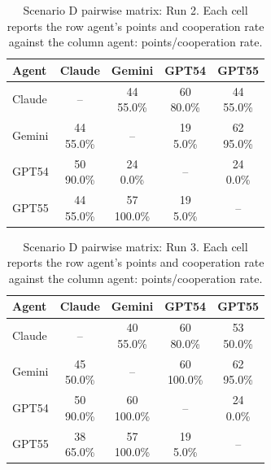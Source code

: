 \documentclass[11pt]{article}
\begin{document}
\begin{table}[H]
\centering
\caption{Scenario D pairwise matrix: Run 2. Each cell reports the row agent's points and cooperation rate against the column agent: points/cooperation rate.}
\label{tab:comm_matrix_run2}
\small
\begin{tabular}{lcccc}
\toprule
Agent & Claude & Gemini & GPT54 & GPT55 \\
\midrule
Claude & -- & \shortstack{44\\55.0\%} & \shortstack{60\\80.0\%} & \shortstack{44\\55.0\%} \\
Gemini & \shortstack{44\\55.0\%} & -- & \shortstack{19\\5.0\%} & \shortstack{62\\95.0\%} \\
GPT54 & \shortstack{50\\90.0\%} & \shortstack{24\\0.0\%} & -- & \shortstack{24\\0.0\%} \\
GPT55 & \shortstack{44\\55.0\%} & \shortstack{57\\100.0\%} & \shortstack{19\\5.0\%} & -- \\
\bottomrule
\end{tabular}
\end{table}

\begin{table}[H]
\centering
\caption{Scenario D pairwise matrix: Run 3. Each cell reports the row agent's points and cooperation rate against the column agent: points/cooperation rate.}
\label{tab:comm_matrix_run3}
\small
\begin{tabular}{lcccc}
\toprule
Agent & Claude & Gemini & GPT54 & GPT55 \\
\midrule
Claude & -- & \shortstack{40\\55.0\%} & \shortstack{60\\80.0\%} & \shortstack{53\\50.0\%} \\
Gemini & \shortstack{45\\50.0\%} & -- & \shortstack{60\\100.0\%} & \shortstack{62\\95.0\%} \\
GPT54 & \shortstack{50\\90.0\%} & \shortstack{60\\100.0\%} & -- & \shortstack{24\\0.0\%} \\
GPT55 & \shortstack{38\\65.0\%} & \shortstack{57\\100.0\%} & \shortstack{19\\5.0\%} & -- \\
\bottomrule
\end{tabular}
\end{table}
\end{document}
